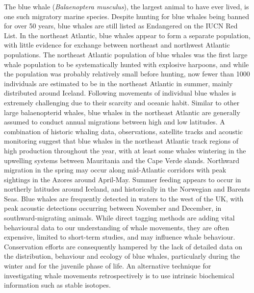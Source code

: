 \documentclass[a4paper,12pt]{article}
\begin{document}
The blue whale (\textit{Balaenoptera musculus}), the largest animal to have ever lived, is one such migratory marine species. 
Despite hunting for blue whales being banned for over 50 years, blue whales are still listed as Endangered on the IUCN Red List\cite{reilly2008balaenoptera}.
In the northeast Atlantic, blue whales appear to form a separate population, with little evidence for exchange between northeast and northwest Atlantic populations\cite{pike2009note}.  
The northeast Atlantic population of blue whales was the first large whale population to be systematically hunted with explosive harpoons, and while the population was probably relatively small before hunting, now fewer than 1000 individuals are estimated to be in the northeast Atlantic in summer, mainly distributed around Iceland\cite{pike2009note}.
Following movements of individual blue whales is extremely challenging due to their scarcity and oceanic habit.
Similar to other large balaenopterid whales, blue whales in the northeast Atlantic are generally assumed to conduct annual migrations between high and low latitudes. 
A combination of historic whaling data, observations, satellite tracks and acoustic monitoring suggest that blue whales in the northeast Atlantic track regions of high production throughout the year, with at least some whales wintering in the upwelling systems between Mauritania and the Cape Verde slands\cite{baines2014upwellings}.
Northward migration in the spring may occur along mid-Atlantic corridors with peak sightings in the Azores around April-May. Summer feeding appears to occur in northerly latitudes around Iceland, and historically in the Norwegian and Barents Seas\cite{pike2009note}.
Blue whales are frequently detected in waters to the west of the UK, with peak acoustic detections occurring between November and December, in southward-migrating animals\cite{reeves2004historical,baines2017autumn,charif2009acoustic,visser2011timing}.
While direct tagging methods are adding vital behavioural data to our understanding of whale movements\cite{borger15,mcdonald2006biogeographic,bailey2009behavioural,mate2007evolution,silva2013north}, they are often expensive, limited to short-term studies\cite{bailey2009behavioural,best2015tag,mate2007evolution}, and may influence whale behaviour\cite{walker2012review}.
Conservation efforts are consequently hampered by the lack of detailed data on the distribution, behaviour and ecology of blue whales, particularly during the winter and for the juvenile phase of life. 
An alternative technique for investigating whale movements retrospectively is to use intrinsic biochemical information such as stable isotopes\cite{west2006stable,busquets2017estimating,hobson2008tracking}. 
\end{document}
